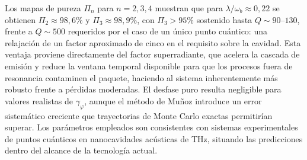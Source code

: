 \documentclass[12pt, letterpaper]{article}
\begin{document}
Los mapas de pureza $\Pi_n$ para $n = 2, 3, 4$ muestran que para $\lambda/\omega_b \approx 0{,}22$
se obtienen $\Pi_2 \approx 98{,}6\%$ y $\Pi_3 \approx 98{,}9\%$, con $\Pi_3 > 95\%$ sostenido
hasta $Q \sim 90$--$130$, frente a $Q \sim 500$ requeridos por el caso de un único punto cuántico:
una relajación de un factor aproximado de cinco en el requisito sobre la cavidad. Esta ventaja
proviene directamente del factor superradiante, que acelera la cascada de emisión y reduce la
ventana temporal disponible para que los procesos fuera de resonancia contaminen el paquete, haciendo
al sistema inherentemente más robusto frente a pérdidas moderadas. El desfase puro resulta negligible
para valores realistas de $\gamma_\varphi$, aunque el método de Muñoz introduce un error sistemático
creciente que trayectorias de Monte Carlo exactas permitirían superar. Los parámetros empleados son
consistentes con sistemas experimentales de puntos cuánticos en nanocavidades acústicas de THz,
situando las predicciones dentro del alcance de la tecnología actual.
\end{document}
